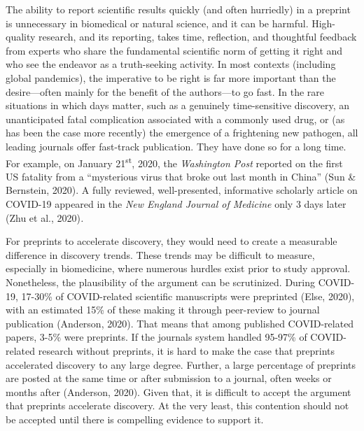 \documentclass[authordate, empirical]{jote-new-article}
\begin{document}
	The ability to report scientific results quickly (and often hurriedly) in a preprint is unnecessary in biomedical or natural science, and it can be harmful. High-quality research, and its reporting, takes time, reflection, and thoughtful feedback from experts who share the fundamental scientific norm of getting it right and who see the endeavor as a truth-seeking activity. In most contexts (including global pandemics), the imperative to be right is far more important than the desire—often mainly for the benefit of the authors—to go fast. In the rare situations in which days matter, such as a genuinely time-sensitive discovery, an unanticipated fatal complication associated with a commonly used drug, or (as has been the case more recently) the emergence of a frightening new pathogen, all leading journals offer fast-track publication. They have done so for a long time. For example, on January 21\textsuperscript{st}, 2020, the \emph{Washington Post }reported on the first US fatality from a “mysterious virus that broke out last month in China” (Sun \& Bernstein, 2020). A fully reviewed, well-presented, informative scholarly article on COVID-19 appeared in the \emph{New England Journal of Medicine }only 3 days later (Zhu et al., 2020)\emph{.}







	For preprints to accelerate discovery, they would need to create a measurable difference in discovery trends. These trends may be difficult to measure, especially in biomedicine, where numerous hurdles exist prior to study approval. Nonetheless, the plausibility of the argument can be scrutinized. During COVID-19, 17-30\% of COVID-related scientific manuscripts were preprinted (Else, 2020), with an estimated 15\% of these making it through peer-review to journal publication (Anderson, 2020). That means that among published COVID-related papers, 3-5\% were preprints. If the journals system handled 95-97\% of COVID-related research without preprints, it is hard to make the case that preprints accelerated discovery to any large degree. Further, a large percentage of preprints are posted at the same time or after submission to a journal, often weeks or months after (Anderson, 2020). Given that, it is difficult to accept the argument that preprints accelerate discovery. At the very least, this contention should not be accepted until there is compelling evidence to support it.
\end{document}

